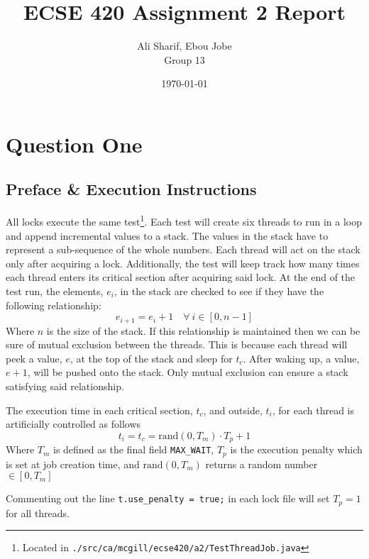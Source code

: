 \documentclass[12pt,letterpaper,titlepage]{article}
\author{Ali Sharif, Ebou Jobe \\ Group 13}
\title{ECSE 420 Assignment 2 Report}
\date{\today}
\begin{document}
  \maketitle
  \newpage
  \tableofcontents
  \newpage
   
  \setlength{\parskip}{1em}
   
  \section{Question One}
  \subsection{Preface \& Execution Instructions}
    All locks execute the same test\footnote{Located in \texttt{./src/ca/mcgill/ecse420/a2/TestThreadJob.java}}. Each test will create six threads to run in a loop and append incremental values to a stack. The values in the stack have to represent a sub-sequence of the whole numbers. Each thread will act on the stack only after acquiring a lock. Additionally, the test will keep track how many times each thread enters its critical section after acquiring said lock. At the end of the test run, the elements, $e_i$, in the stack are checked to see if they have the following relationship:
    \begin{equation*}
      e_{i+1} = e_i + 1 \quad \forall \ i \in [0, n-1]
    \end{equation*}
    Where $n$ is the size of the stack. If this relationship is maintained then we can be sure of mutual exclusion between the threads. This is because each thread will peek a value, $e$, at the top of the stack and sleep for $t_c$. After waking up, a value, $e+1$, will be pushed onto the stack. Only mutual exclusion can ensure a stack satisfying said relationship.
    
    The execution time in each critical section, $t_c$, and outside, $t_i$, for each thread is artificially controlled as follows
    \begin{equation*}
      t_i = t_c = \text{rand}(0, T_m) \cdot T_p + 1
    \end{equation*}
    Where $T_m$ is defined as the final field \texttt{MAX\_WAIT}, $T_p$ is the execution penalty which is set at job creation time, and $\text{rand}(0, T_m)$ returns a random number $\in [0, T_m]$
    
    Commenting out the line \texttt{t.use\_penalty = true;} in each lock file will set $T_p = 1$ for all threads.
    
\end{document}
